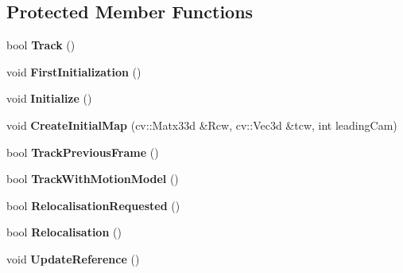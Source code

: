 \subsection*{Protected Member Functions}
\begin{DoxyCompactItemize}
\item 
bool {\bfseries Track} ()\hypertarget{classMultiColSLAM_1_1cTracking_abbe8f401a1a021925bd62e9d0ff07a7b}{}\label{classMultiColSLAM_1_1cTracking_abbe8f401a1a021925bd62e9d0ff07a7b}

\item 
void {\bfseries First\+Initialization} ()\hypertarget{classMultiColSLAM_1_1cTracking_a065b985168f37eea2c3bbf4d03cf7f24}{}\label{classMultiColSLAM_1_1cTracking_a065b985168f37eea2c3bbf4d03cf7f24}

\item 
void {\bfseries Initialize} ()\hypertarget{classMultiColSLAM_1_1cTracking_aa5257c7830b4cb4b7e4a51a05add7193}{}\label{classMultiColSLAM_1_1cTracking_aa5257c7830b4cb4b7e4a51a05add7193}

\item 
void {\bfseries Create\+Initial\+Map} (cv\+::\+Matx33d \&Rcw, cv\+::\+Vec3d \&tcw, int leading\+Cam)\hypertarget{classMultiColSLAM_1_1cTracking_a752926822de4043e948b9a927c3f5d9a}{}\label{classMultiColSLAM_1_1cTracking_a752926822de4043e948b9a927c3f5d9a}

\item 
bool {\bfseries Track\+Previous\+Frame} ()\hypertarget{classMultiColSLAM_1_1cTracking_a526495a5c5623bfab152392bb895cb15}{}\label{classMultiColSLAM_1_1cTracking_a526495a5c5623bfab152392bb895cb15}

\item 
bool {\bfseries Track\+With\+Motion\+Model} ()\hypertarget{classMultiColSLAM_1_1cTracking_adc09389c63cef2c9c0e29decf81c0927}{}\label{classMultiColSLAM_1_1cTracking_adc09389c63cef2c9c0e29decf81c0927}

\item 
bool {\bfseries Relocalisation\+Requested} ()\hypertarget{classMultiColSLAM_1_1cTracking_ab54f1d6d18f1a6bf7970c8745b370cb5}{}\label{classMultiColSLAM_1_1cTracking_ab54f1d6d18f1a6bf7970c8745b370cb5}

\item 
bool {\bfseries Relocalisation} ()\hypertarget{classMultiColSLAM_1_1cTracking_a75d66da2b7802160f008e9d957ad7664}{}\label{classMultiColSLAM_1_1cTracking_a75d66da2b7802160f008e9d957ad7664}

\item 
void {\bfseries Update\+Reference} ()\hypertarget{classMultiColSLAM_1_1cTracking_a59b44e1fd48d0a41efcda1f97e5a2358}{}\label{classMultiColSLAM_1_1cTracking_a59b44e1fd48d0a41efcda1f97e5a2358}


\end{DoxyCompactItemize}
